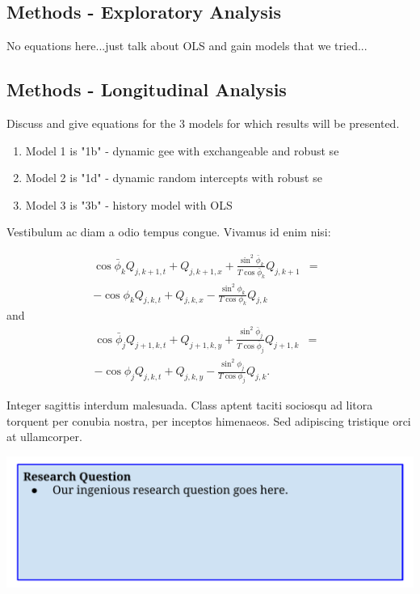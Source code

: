 \documentclass[a0,landscape]{a0poster}
\begin{document}
\begin{multicols}{3}
\subsection*{Methods - Exploratory Analysis}

No equations here...just talk about OLS and gain models that we tried... 

\subsection*{Methods - Longitudinal Analysis}

Discuss and give equations for the 3 models for which results will be presented.

\begin{enumerate}
\item Model 1 is "1b" - dynamic gee with exchangeable and robust se
\item Model 2 is "1d" - dynamic random intercepts with robust se
\item Model 3 is "3b" - history model with OLS
\end{enumerate}

Vestibulum ac diam a odio tempus congue. Vivamus id enim nisi:

\begin{eqnarray}
\cos\bar{\phi}_k Q_{j,k+1,t} + Q_{j,k+1,x}+\frac{\sin^2\bar{\phi}_k}{T\cos\bar{\phi}_k} Q_{j,k+1} &=&\nonumber\\ 
-\cos\phi_k Q_{j,k,t} + Q_{j,k,x}-\frac{\sin^2\phi_k}{T\cos\phi_k} Q_{j,k}\label{edgek}
\end{eqnarray}
and
\begin{eqnarray}
\cos\bar{\phi}_j Q_{j+1,k,t} + Q_{j+1,k,y}+\frac{\sin^2\bar{\phi}_j}{T\cos\bar{\phi}_j} Q_{j+1,k}&=&\nonumber \\
-\cos\phi_j Q_{j,k,t} + Q_{j,k,y}-\frac{\sin^2\phi_j}{T\cos\phi_j} Q_{j,k}.\label{edgej}
\end{eqnarray} 

Integer sagittis interdum malesuada. Class aptent taciti sociosqu ad litora torquent per conubia nostra, per inceptos himenaeos. Sed adipiscing tristique orci at ullamcorper.

\begin{center}\vspace{1cm}
\includegraphics[width=1.0\linewidth]{ResearchQuestion.pdf}
\end{center}\vspace{1cm}


\end{multicols}
\end{document}
